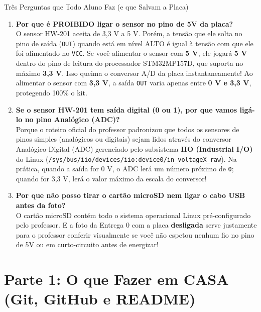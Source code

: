 \documentclass[11pt,a4paper]{article}
\begin{document}
\begin{alertbox}{Três Perguntas que Todo Aluno Faz (e que Salvam a Placa)}
\begin{enumerate}[leftmargin=*]
    \item \textbf{Por que é PROIBIDO ligar o sensor no pino de 5V da placa?} \\
    O sensor HW-201 aceita de 3,3 V a 5 V. Porém, a tensão que ele solta no pino de saída (\texttt{OUT}) quando está em nível ALTO é igual à tensão com que ele foi alimentado no \texttt{VCC}. Se você alimentar o sensor com \textbf{5 V}, ele jogará \textbf{5 V} dentro do pino de leitura do processador STM32MP157D, que suporta no máximo \textbf{3,3 V}. Isso queima o conversor A/D da placa instantaneamente! Ao alimentar o sensor com \textbf{3,3 V}, a saída \texttt{OUT} varia apenas entre \textbf{0 V e 3,3 V}, protegendo 100\% o kit.
    
    \item \textbf{Se o sensor HW-201 tem saída digital (0 ou 1), por que vamos ligá-lo no pino Analógico (ADC)?} \\
    Porque o roteiro oficial do professor padronizou que todos os sensores de pinos simples (analógicos ou digitais) sejam lidos através do conversor Analógico-Digital (ADC) gerenciado pelo subsistema \textbf{IIO (Industrial I/O)} do Linux (\texttt{/sys/bus/iio/devices/iio:device0/in\_voltageX\_raw}). Na prática, quando a saída for 0 V, o ADC lerá um número próximo de \texttt{0}; quando for 3,3 V, lerá o valor máximo da escala do conversor!
    
    \item \textbf{Por que não posso tirar o cartão microSD nem ligar o cabo USB antes da foto?} \\
    O cartão microSD contém todo o sistema operacional Linux pré-configurado pelo professor. E a foto da Entrega 0 com a placa \textbf{desligada} serve justamente para o professor conferir visualmente se você não espetou nenhum fio no pino de 5V ou em curto-circuito antes de energizar!
\end{enumerate}
\end{alertbox}

\newpage
\section{Parte 1: O que Fazer em CASA (Git, GitHub e README)}
\end{document}
